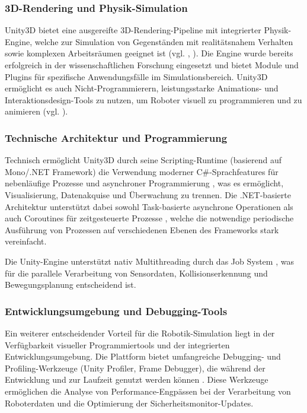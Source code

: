 \subsubsection{3D-Rendering und Physik-Simulation}

Unity3D bietet eine ausgereifte 3D-Rendering-Pipeline mit integrierter
Physik-Engine, welche zur Simulation von Gegenständen mit realitätsnahem
Verhalten sowie komplexen Arbeitsräumen geeignet ist (vgl.
, ). Die
Engine wurde bereits erfolgreich in der wissenschaftlichen Forschung eingesetzt
und bietet Module und Plugins für spezifische Anwendungsfälle im
Simulationsbereich. Unity3D ermöglicht es auch Nicht-Programmierern,
leistungsstarke Animations- und Interaktionsdesign-Tools zu nutzen, um Roboter
visuell zu programmieren und zu animieren (vgl. ).

\subsubsection{Technische Architektur und Programmierung}

Technisch ermöglicht Unity3D durch seine Scripting-Runtime (basierend auf
Mono/.NET Framework) die Verwendung moderner C\#-Sprachfeatures für
nebenläufige Prozesse und asynchroner Programmierung
, was es ermöglicht, Visualisierung,
Datenakquise und Überwachung zu trennen. Die .NET-basierte Architektur
unterstützt dabei sowohl Task-basierte asynchrone Operationen als auch
Coroutines für zeitgesteuerte Prozesse
, welche die notwendige periodische
Ausführung von Prozessen auf verschiedenen Ebenen des Frameworks stark
vereinfacht.

Die Unity-Engine unterstützt nativ Multithreading durch das Job System
, was für die parallele Verarbeitung
von Sensordaten, Kollisionserkennung und Bewegungsplanung entscheidend ist.

\subsubsection{Entwicklungsumgebung und Debugging-Tools}

Ein weiterer entscheidender Vorteil für die Robotik-Simulation liegt in der
Verfügbarkeit visueller Programmiertools und der integrierten
Entwicklungsumgebung. Die Plattform bietet umfangreiche Debugging- und
Profiling-Werkzeuge (Unity Profiler, Frame Debugger), die während der
Entwicklung und zur Laufzeit genutzt werden können
. Diese Werkzeuge ermöglichen die
Analyse von Performance-Engpässen bei der Verarbeitung von Roboterdaten und die
Optimierung der Sicherheitsmonitor-Updates.

